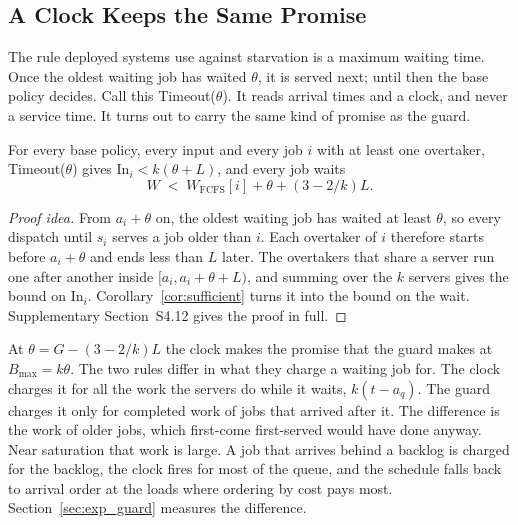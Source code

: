 
\subsection{A Clock Keeps the Same Promise}
\label{sec:clock}

The rule deployed systems use against starvation is a maximum waiting time. Once the
oldest waiting job has waited $\theta$, it is served next; until then the base policy
decides. Call this Timeout($\theta$). It reads arrival times and a clock, and never a
service time. It turns out to carry the same kind of promise as the guard.

\begin{proposition}
\label{prop:clock}
For every base policy, every input and every job $i$ with at least one overtaker,
Timeout($\theta$) gives $\mathrm{In}_i < k(\theta + L)$, and every job waits
\[
  W \;<\; W_{\mathrm{FCFS}}[i] + \theta + (3 - 2/k)L .
\]
\end{proposition}

\begin{proof}[Proof idea]
From $a_i + \theta$ on, the oldest waiting job has waited at least $\theta$, so every
dispatch until $s_i$ serves a job older than $i$. Each overtaker of $i$ therefore starts
before $a_i + \theta$ and ends less than $L$ later. The overtakers that share a server
run one after another inside $[a_i, a_i + \theta + L)$, and summing over the $k$
servers gives the bound on $\mathrm{In}_i$. Corollary~\ref{cor:sufficient} turns it
into the bound on the wait. Supplementary Section~S4.12 gives the proof in full.
\end{proof}

At $\theta = G - (3-2/k)L$ the clock makes the promise that the guard makes at
$B_{\max} = k\theta$. The two rules differ in what they charge a waiting job for. The
clock charges it for all the work the servers do while it waits, $k(t - a_q)$. The
guard charges it only for completed work of jobs that arrived after it. The
difference is the work of older jobs, which first-come first-served would have done
anyway. Near saturation that work is large. A job that arrives behind a backlog is
charged for the backlog, the clock fires for most of the queue, and the schedule falls
back to arrival order at the loads where ordering by cost pays most.
Section~\ref{sec:exp_guard} measures the difference.


